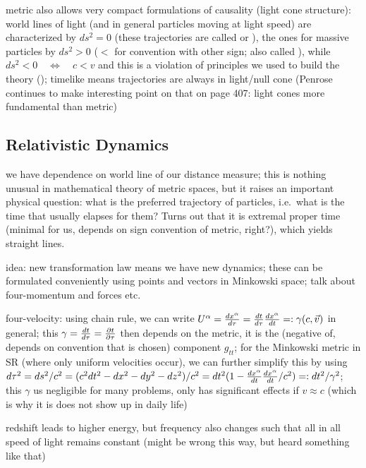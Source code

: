 metric also allows very compact formulations of causality (light cone structure): world lines of light (and in general particles moving at light speed) are characterized by $ds^2 = 0$ (these trajectories are called  or ), the ones for massive particles by $ds^2 > 0$ ($<$ for convention with other sign; also called ), while $ds^2 < 0 \quad \Leftrightarrow \quad c < v$ and this is a violation of principles we used to build the theory (); timelike means trajectories are always in light/null cone (Penrose continues to make interesting point on that on page 407: light cones more fundamental than metric)








		\subsection{Relativistic Dynamics}
we have dependence on world line of our distance measure; this is nothing unusual in mathematical theory of metric spaces, but it raises an important physical question: what is the preferred trajectory of particles, i.e.~what is the time that usually elapses for them? Turns out that it is extremal proper time (minimal for us, depends on sign convention of metric, right?), which yields straight lines.


idea: new transformation law means we have new dynamics; these can be formulated conveniently using points and vectors in Minkowski space; talk about four-momentum and forces etc.



four-velocity: using chain rule, we can write $U^\alpha = \dv{x^\alpha}{\tau} = \dv{t}{\tau} \dv{x^\alpha}{t} =: \gamma (c, \vec{v})$ in general; this $\gamma = \dv{t}{\tau} = \pdv{t}{\tau}$ then depends on the metric, it is the (negative of, depends on convention that is chosen) component $g_{tt}$; for the Minkowski metric in SR (where only uniform velocities occur), we can further simplify this by using $d\tau^2 = ds^2 / c^2 = (c^2 dt^2 - dx^2 - dy^2 - dz^2) / c^2 = dt^2 (1 - \dv{x^\alpha}{t} \dv{x^\alpha}{t} / c^2) =: dt^2 / \gamma^2$; this $\gamma$ us negligible for many problems, only has significant effects if $v \approx c$ (which is why it is does not show up in daily life)



redshift leads to higher energy, but frequency also changes such that all in all speed of light remains constant (might be wrong this way, but heard something like that)



